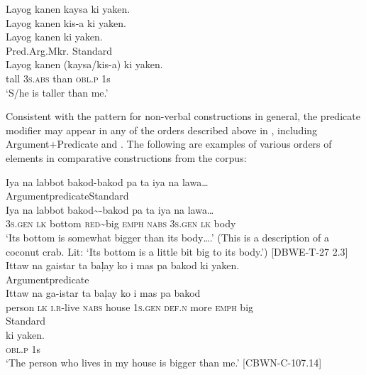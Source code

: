 \ea
\label{bkm:Ref107820669} 
Layog    kanen  kaysa  ki  yaken. \\
Layog    kanen  kis-a  ki  yaken. \\
Layog    kanen  ki  yaken. \\\smallskip
Pred.\hspace{.2cm}Arg.\hspace{.4cm}Mkr.\hspace{1.3cm}  Standard \\
\gll Layog    kanen  (kaysa/kis-a)  ki  yaken. \\
tall    3\textsc{s.abs}  than  \textsc{obl.p}  1s \\
\glt ‘S/he is taller than me.’
\z

Consistent with the pattern for non-verbal constructions in general, the predicate modifier may appear in any of the orders described above in , including Argument+Predicate and . The following are examples of various orders of elements in comparative constructions from the corpus:

\ea
Iya  na  labbot  bakod-bakod  pa  ta  iya  na  lawa… \\\smallskip
Argument\hspace{1.2cm}predicate\hspace{1.6cm}Standard \\
\gll Iya  na  labbot  bakod\sim{}-bakod  pa  ta  iya  na  lawa… \\
3\textsc{s.gen}  \textsc{lk}  bottom  \textsc{red}\sim{}big  \textsc{emph}  \textsc{nabs}  3\textsc{s.gen}  \textsc{lk}  body \\
\glt ‘Its bottom is somewhat bigger than its body….’ (This is a description of a coconut crab. Lit: ‘Its bottom is a little bit big to its body.’) [DBWE-T-27 2.3]
\z
\ea
Ittaw  na  gaistar  ta  baļay  ko  i  mas  pa  bakod  ki  yaken. \\\smallskip
Argument\hspace{5.3cm}predicate \\
\gll Ittaw  na  ga-istar  ta  baļay  ko  i  mas  pa  bakod {\quad} \\
person  \textsc{lk}  \textsc{i.r}-live  \textsc{nabs}  house  1\textsc{s.gen}  \textsc{def.n}  more  \textsc{emph}  big \\
Standard \\
\gll ki  yaken. \\
\textsc{obl.p}  1s \\
\glt ‘The person who lives in my house is bigger than me.’ [CBWN-C-107.14]
\z

